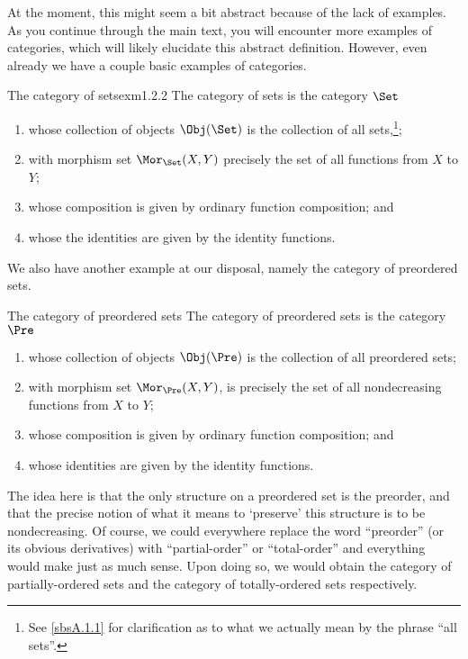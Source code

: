 At the moment, this might seem a bit abstract because of the lack of examples.  As you continue through the main text, you will encounter more examples of categories, which will likely elucidate this abstract definition.  However, even already we have a couple basic examples of categories.
\begin{exm}{The category of sets}{exm1.2.2}
The category of sets is the category $\Set$\index[notation]{$\Set$}
\begin{enumerate}
\item whose collection of objects $\Obj (\Set )$ is the collection of all sets,\footnote{See \cref{sbsA.1.1} for clarification as to what we actually mean by the phrase ``all sets''.};
\item with morphism set $\Mor _{\Set}(X,Y)$ precisely the set of all functions from $X$ to $Y$;
\item whose composition is given by ordinary function composition; and
\item whose the identities are given by the identity functions.
\end{enumerate}
\end{exm}
We also have another example at our disposal, namely the category of preordered sets.
\begin{exm}{The category of preordered sets}{}
The category of preordered sets is the category $\Pre$\index[notation]{$\Pre$}
\begin{enumerate}
\item whose collection of objects $\Obj (\Pre )$ is the collection of all preordered sets;
\item with morphism set $\Mor _{\Pre}(X,Y)$, is precisely the set of all nondecreasing functions from $X$ to $Y$;
\item whose composition is given by ordinary function composition; and
\item whose identities are given by the identity functions.
\end{enumerate}
\end{exm}
The idea here is that the only structure on a preordered set is the preorder, and that the precise notion of what it means to `preserve' this structure is to be nondecreasing.  Of course, we could everywhere replace the word ``preorder'' (or its obvious derivatives) with ``partial-order'' or ``total-order'' and everything would make just as much sense.  Upon doing so, we would obtain the category of partially-ordered sets and the category of totally-ordered sets respectively.

